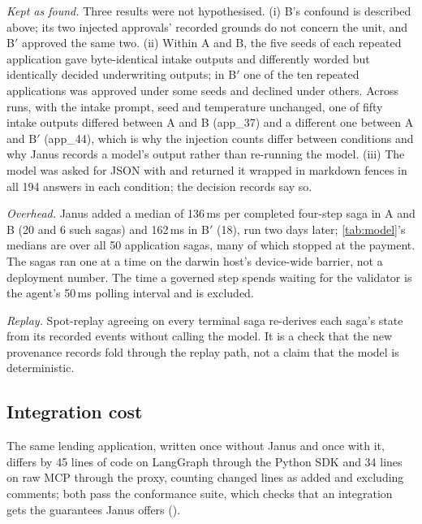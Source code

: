 \emph{Kept as found.} Three results were not hypothesised. (i) B's confound is
described above; its two injected approvals' recorded grounds do not concern the
unit, and B$'$ approved the same two. (ii) Within A and B, the five seeds of each
repeated application gave byte-identical intake outputs and differently worded
but identically decided underwriting outputs; in B$'$ one of the ten repeated
applications was approved under some seeds and declined under others. Across
runs, with the intake prompt, seed and temperature unchanged, one of fifty intake
outputs differed between A and B (app\_37) and a different one between A and
B$'$ (app\_44), which is why the injection counts differ between conditions and
why Janus records a model's output rather than re-running the model. (iii) The model
was asked for JSON with  and returned it wrapped in markdown
fences in all 194 answers in each condition; the decision records say so.

\emph{Overhead.} Janus added a median of 136\,ms per completed four-step saga in
A and B (20 and 6 such sagas) and 162\,ms in B$'$ (18), run two days later;
\cref{tab:model}'s medians are over all 50 application sagas, many of which
stopped at the payment. The sagas ran one at a time on the darwin host's
device-wide barrier, not a deployment number. The time a governed step spends
waiting for the validator is the agent's 50\,ms polling interval and is excluded.

\emph{Replay.} Spot-replay agreeing on every terminal saga re-derives each saga's
state from its recorded events without calling the model. It is a check that the
new provenance records fold through the replay path, not a claim that the model
is deterministic.

\subsection{Integration cost}
The same lending application, written once without Janus and once with it,
differs by 45 lines of code on LangGraph through the Python SDK and 34 lines on
raw MCP through the proxy, counting changed lines as added and excluding comments;
both pass the conformance suite, which checks that an integration gets the
guarantees Janus offers ().
